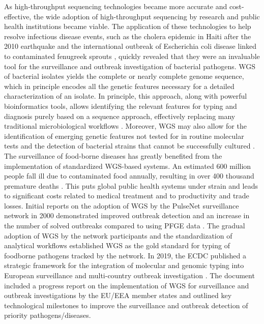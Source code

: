 As high-throughput sequencing technologies became more accurate and cost-effective, the wide adoption of high-throughput sequencing by research and public health institutions became viable. The application of these technologies to help resolve infectious disease events, such as the cholera epidemic in Haiti after the 2010 earthquake \cite{barzilay_cholera_2013} and the international outbreak of Escherichia coli disease linked to contaminated fenugreek sprouts \cite{king_outbreak_2012, mellmann_prospective_2011}, quickly revealed that they were an invaluable tool for the surveillance and outbreak investigation of bacterial pathogens. \ac{WGS} of bacterial isolates yields the complete or nearly complete genome sequence, which in principle encodes all the genetic features necessary for a detailed characterization of an isolate. In principle, this approach, along with powerful bioinformatics tools, allows identifying the relevant features for typing and diagnosis purely based on a sequence approach, effectively replacing many traditional microbiological workflows \cite{besser_next-generation_2018, deurenberg_application_2017}. Moreover, \ac{WGS} may also allow for the identification of emerging genetic features not tested for in routine molecular tests and the detection of bacterial strains that cannot be successfully cultured \cite{deurenberg_application_2017}.
The surveillance of food-borne diseases has greatly benefited from the implementation of standardized \ac{WGS}-based systems. An estimated 600 million people fall ill due to contaminated food annually, resulting in over 400 thousand premature deaths \cite{noauthor_who_nodate}. This puts global public health systems under strain and leads to significant costs related to medical treatment and to productivity and trade losses. Initial reports on the adoption of \ac{WGS} by the PulseNet surveillance network in 2000 demonstrated improved outbreak detection and an increase in the number of solved outbreaks compared to using PFGE data \cite{besser_next-generation_2018, jackson_implementation_2016, ribot_pulsenet_2019}. The gradual adoption of \ac{WGS} by the network participants and the standardization of analytical workflows established \ac{WGS} as the gold standard for typing of foodborne pathogens tracked by the network.
In 2019, the \ac{ECDC} published a strategic framework for the integration of molecular and genomic typing into European surveillance and multi-country outbreak investigation \cite{european_centre_for_disease_prevention_and_control_ecdc_2019}. The document included a progress report on the implementation of \ac{WGS} for surveillance and outbreak investigations by the \ac{EU/EEA} member states and outlined key technological milestones to improve the surveillance and outbreak detection of priority pathogens/diseases.

